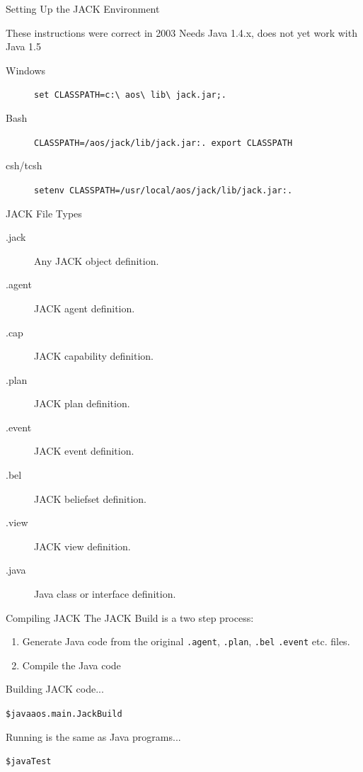 \documentclass[aspectratio=1610,xcolor=dvipsnames,t]{beamer}
\begin{document}
\begin{frame}{Setting Up the JACK Environment} 
    \begin{alertblock}{These instructions were correct in 2003} 
        Needs Java 1.4.x, does not yet work with Java 1.5
        \begin{description}
            \item[Windows] 
                \texttt{set
                CLASSPATH=c:\textbackslash~aos\textbackslash~lib\textbackslash~jack.jar;.}
            \item[Bash] 
                \texttt{CLASSPATH=/aos/jack/lib/jack.jar:. export CLASSPATH} 
            \item[csh/tcsh]
                \texttt{setenv CLASSPATH=/usr/local/aos/jack/lib/jack.jar:. } 
        \end{description}
    \end{alertblock}
\end{frame} 

\begin{frame}{JACK File Types}
    \begin{description}
        \item[.jack] Any JACK object definition.
        \item[.agent] JACK agent definition.
        \item[.cap] JACK capability definition.
        \item[.plan] JACK plan definition.
        \item[.event] JACK event definition.
        \item[.bel] JACK beliefset definition.
        \item[.view] JACK view definition.
        \item[.java] Java class or interface definition. 
    \end{description}
\end{frame} 

\begin{frame}{Compiling JACK}
    The JACK Build is a two step process:
    \begin{enumerate}
        \item Generate Java code from the original 
              \texttt{.agent}, \texttt{.plan}, \texttt{.bel}
              \texttt{.event} etc. files.
        \item Compile the Java code
    \end{enumerate}
    \begin{block}{Building JACK code...}
        \begin{alltt}
            \$ java aos.main.JackBuild
        \end{alltt} 
    \end{block} 
    \begin{exampleblock}{Running is the same as Java programs...}
        \begin{alltt}
            \$ java Test
        \end{alltt} 
    \end{exampleblock} 
\end{frame} 
\end{document}
